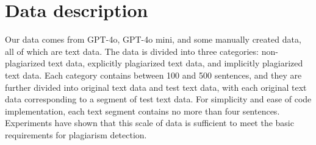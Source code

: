 \section{Data description}
Our data comes from GPT-4o, GPT-4o mini, and some manually created data, all of which are text data. The data is divided into three categories: non-plagiarized text data, explicitly plagiarized text data, and implicitly plagiarized text data. Each category contains between 100 and 500 sentences, and they are further divided into original text data and test text data, with each original text data corresponding to a segment of test text data. For simplicity and ease of code implementation, each text segment contains no more than four sentences. Experiments have shown that this scale of data is sufficient to meet the basic requirements for plagiarism detection.